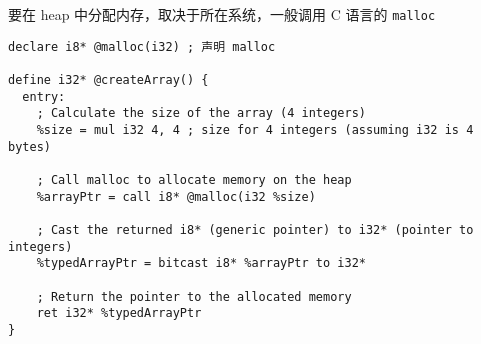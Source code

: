 要在 heap 中分配内存，取决于所在系统，一般调用 C 语言的 \verb`malloc`
\begin{lstlisting}[language=none]
declare i8* @malloc(i32) ; 声明 malloc

define i32* @createArray() {
  entry:
    ; Calculate the size of the array (4 integers)
    %size = mul i32 4, 4 ; size for 4 integers (assuming i32 is 4 bytes)

    ; Call malloc to allocate memory on the heap
    %arrayPtr = call i8* @malloc(i32 %size)

    ; Cast the returned i8* (generic pointer) to i32* (pointer to integers)
    %typedArrayPtr = bitcast i8* %arrayPtr to i32*

    ; Return the pointer to the allocated memory
    ret i32* %typedArrayPtr
}
\end{lstlisting}
